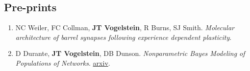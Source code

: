 \documentclass[english]{ecv}
\begin{document}
\subsection*{Pre-prints}

\begin{enumerate}
\item NC Weiler, FC Collman, \textbf{JT Vogelstein}, R Burns, SJ Smith. \emph{Molecular architecture of  barrel synapses following experience dependent plasticity}.

\item 	D Durante, \textbf{JT Vogelstein}, DB Dunson. \emph{Nonparametric Bayes Modeling of Populations of Networks}. \href{http://arxiv.org/abs/1406.7851}{arxiv}.






		

			
	
			

\end{enumerate}
\end{document}
